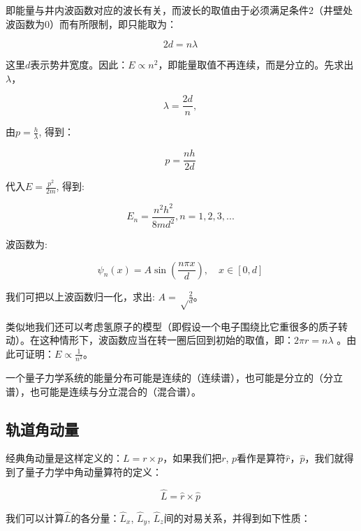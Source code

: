 即能量与井内波函数对应的波长有关，而波长的取值由于必须满足条件2（井壁处波函数为0）而有所限制，即只能取为：

\begin{equation}
2d = n \lambda~
\end{equation}

这里$d$表示势井宽度。因此：$E \propto n^2$，即能量取值不再连续，而是分立的。先求出$\lambda$，

\begin{equation}
\lambda = \frac{2d}{n},~
\end{equation}

由$p =\frac{h}{\lambda}$, 得到：

\begin{equation}
p = \frac{nh}{2d}~
\end{equation}

代入$E = \frac{p^2}{2m}$, 得到:

\begin{equation}
E_n = \frac{n^2 h^2}{8m d^2}, n=1,2,3,...~
\end{equation}

波函数为:

\begin{equation}
\psi_n(x) = A \sin \left( \frac{n \pi x}{d} \right), \quad x \in [0, d]~
\end{equation}


我们可把以上波函数归一化，求出: $A= \sqrt \frac{2}{d}$。

类似地我们还可以考虑氢原子的模型（即假设一个电子围绕比它重很多的质子转动）。在这种情形下，波函数应当在转一圈后回到初始的取值，即：$2 \pi r = n \lambda$ 。由此可证明：$E \propto \frac{1}{n^2}$。

一个量子力学系统的能量分布可能是连续的（连续谱），也可能是分立的（分立谱），也可能是连续与分立混合的（混合谱）。

\subsection{轨道角动量}

经典角动量是这样定义的：$L = r \times p$，如果我们把$r$,
$p$看作是算符$\hat r$，$\hat p$，我们就得到了量子力学中角动量算符的定义：

\begin{equation}
\hat L = \hat r \times \hat p~
\end{equation}

我们可以计算$\hat L$的各分量：$\hat L_x$, $\hat L_y$, $\hat L_z$间的对易关系，并得到如下性质：


